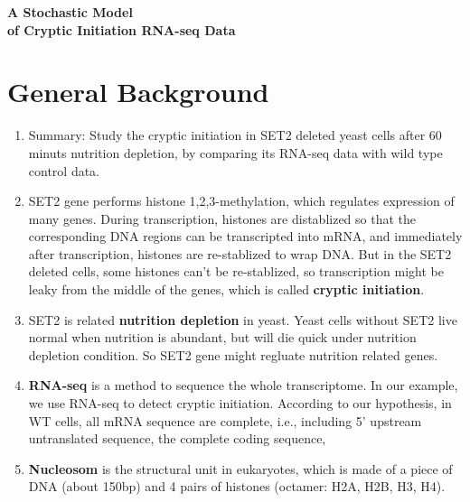\documentclass{article}
\begin{document}
\pagestyle{empty}

\begin{title}
	{\Large\bf A Stochastic Model  \\of Cryptic Initiation RNA-seq Data }
\end{title}
\author{ Jie Huang }
\date{6/29/2016}
\maketitle





\tableofcontents
\newpage
\noindent
\section{General Background}
\begin{enumerate}
	\item Summary: Study the cryptic initiation in SET2 deleted yeast cells after 60 minuts nutrition depletion, by comparing its RNA-seq data with wild type control data.
	\item SET2 gene performs histone 1,2,3-methylation, which regulates expression of many genes. During transcription, histones are distablized so that the corresponding DNA regions can be transcripted into mRNA, and immediately after transcription, histones are re-stablized to wrap DNA. But in the SET2 deleted cells, some histones can't be re-stablized, so transcription might be leaky from the middle of the genes, which is called \textbf{cryptic initiation}.
	\item SET2 is related \textbf{nutrition depletion} in yeast. Yeast cells without SET2 live normal when nutrition is abundant, but will die quick under nutrition depletion condition. So SET2 gene might regluate nutrition related genes.
	\item \textbf{RNA-seq} is a method to sequence the whole transcriptome. In our example, we use RNA-seq to detect cryptic initiation. According to our hypothesis, in WT cells, all mRNA sequence are complete, i.e., including 5' upstream untranslated sequence, the complete coding sequence, 
	\item \textbf{Nucleosom} is the structural unit in eukaryotes, which is made of a piece of DNA (about 150bp) and 4 pairs of histones (octamer: H2A, H2B, H3, H4).
\end{enumerate}

\newpage
\end{document}
